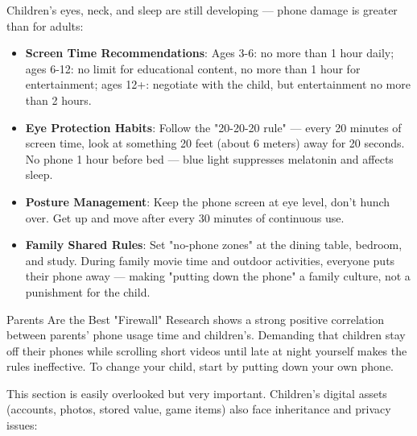 
Children's eyes, neck, and sleep are still developing — phone damage is greater than for adults:

\begin{itemize}
  \item \textbf{Screen Time Recommendations}: Ages 3-6: no more than 1 hour daily; ages 6-12: no limit for educational content, no more than 1 hour for entertainment; ages 12+: negotiate with the child, but entertainment no more than 2 hours.
  \item \textbf{Eye Protection Habits}: Follow the "20-20-20 rule" — every 20 minutes of screen time, look at something 20 feet (about 6 meters) away for 20 seconds. No phone 1 hour before bed — blue light suppresses melatonin and affects sleep.
  \item \textbf{Posture Management}: Keep the phone screen at eye level, don't hunch over. Get up and move after every 30 minutes of continuous use.
  \item \textbf{Family Shared Rules}: Set "no-phone zones" at the dining table, bedroom, and study. During family movie time and outdoor activities, everyone puts their phone away — making "putting down the phone" a family culture, not a punishment for the child.
\end{itemize}

\begin{tcbinfo}{Parents Are the Best "Firewall"}
Research shows a strong positive correlation between parents' phone usage time and children's. Demanding that children stay off their phones while scrolling short videos until late at night yourself makes the rules ineffective. To change your child, start by putting down your own phone.

\end{tcbinfo}


This section is easily overlooked but very important. Children's digital assets (accounts, photos, stored value, game items) also face inheritance and privacy issues:

